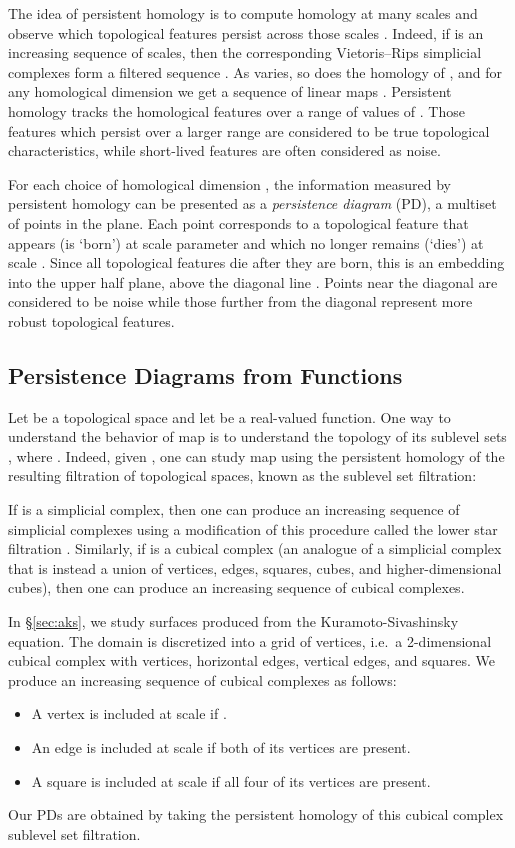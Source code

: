 \documentclass[11pt]{article}
\begin{document}
The idea of persistent homology is to compute homology at many scales and observe which topological features persist across those scales \citep{barcodes,carlsson2009topology,edelsbrunner2008persistent}. Indeed, if  is an increasing sequence of scales, then the corresponding Vietoris--Rips simplicial complexes form a filtered sequence . As  varies, so does the homology of , and for any homological dimension  we get a sequence of linear maps . Persistent homology tracks the homological features over a range of values of . Those features which persist over a larger range are considered to be true topological characteristics, while short-lived features are often considered as noise.

For each choice of homological dimension , the information measured by persistent homology can be presented as a \emph{persistence diagram} (PD), a multiset of points in the plane. Each point  corresponds to a topological feature that appears (is `born') at scale parameter  and which no longer remains (`dies') at scale . Since all topological features die after they are born, this is an embedding into the upper half plane, above the diagonal line . Points near the diagonal are considered to be noise while those further from the diagonal represent more robust topological features.

\subsection{Persistence Diagrams from Functions}\label{app:PD_Functions}

Let  be a topological space and let  be a real-valued function. One way to understand the behavior of map  is to understand the topology of its sublevel sets , where . Indeed, given , one can study map  using the persistent homology of the resulting filtration of topological spaces, known as the sublevel set filtration:

If  is a simplicial complex, then one can produce an increasing sequence of simplicial complexes using a modification of this procedure called the lower star filtration \citep{Edelsbrunner10}. Similarly, if  is a cubical complex (an analogue of a simplicial complex that is instead a union of vertices, edges, squares, cubes, and higher-dimensional cubes), then one can produce an increasing sequence of cubical complexes.

In \S\ref{sec:aks}, we study surfaces  produced from the Kuramoto-Sivashinsky equation. The domain  is discretized into a grid of  vertices, i.e.\ a 2-dimensional cubical complex with  vertices,  horizontal edges,  vertical edges, and  squares. We produce an increasing sequence of cubical complexes as follows:
\begin{itemize}
\item A vertex  is included at scale  if .
\item An edge is included at scale  if both of its vertices are present.
\item A square is included at scale  if all four of its vertices are present.
\end{itemize}
Our PDs are obtained by taking the persistent homology of this cubical complex sublevel set filtration.
\end{document}
